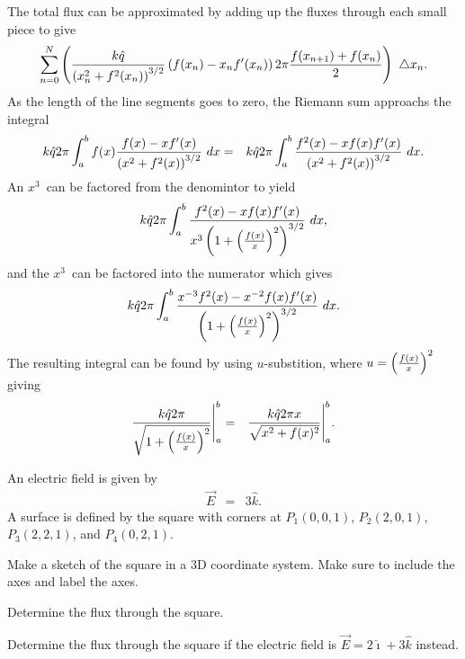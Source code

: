 The total flux can be approximated by adding up the fluxes through
each small piece to give
\begin{eqnarray*}
  \sum_{n=0}^N \left( \frac{k\hat{q}}{\left( x_n^2+f^2(x_n)\right)^{3/2} }
  \left( f(x_n) - x_n f'(x_n) \right) 2 \pi \frac{f(x_{n+1})+f(x_n)}{2} \right)
  ~ \triangle x_n.
\end{eqnarray*}
As the length of the line segments goes to zero, the Riemann sum
approachs the integral
\begin{eqnarray*}
  k\hat{q}2\pi \int^b_a f(x)\frac{f(x)-xf'(x)}{\left( x^2+f^2(x) \right)^{3/2}}
     ~ dx & = &
     k\hat{q}2\pi \int^b_a \frac{f^2(x)-xf(x)f'(x)}{\left( x^2+f^2(x)
       \right)^{3/2}} ~ dx.
\end{eqnarray*}
An $x^3$\ can be factored from the denomintor to yield
\begin{eqnarray*}
  k\hat{q}2\pi \int^b_a \frac{f^2(x)-xf(x)f'(x)}{x^3 \left(
    1+\left( \frac{f(x)}{x} \right)^2 \right)^{3/2}} ~ dx,
\end{eqnarray*}
and the $x^3$\ can be factored into the numerator which gives
\begin{eqnarray*}
  k\hat{q}2\pi \int^b_a \frac{x^{-3}f^2(x)-x^{-2}f(x)f'(x)}{\left(
    1+\left( \frac{f(x)}{x} \right)^2 \right)^{3/2}} ~ dx.
\end{eqnarray*}
The resulting integral can be found by using $u$-substition, where
$u=\left( \frac{f(x)}{x} \right)^2$ giving
\begin{eqnarray*}
    \frac{k\hat{q}2\pi}{\sqrt{1+\left( \frac{f(x)}{x} \right)^2 }}
     \Bigg|^b_a
     & = & \frac{k\hat{q}2\pi x}{\sqrt{x^2 + f(x)^2}}
     \Bigg|^b_a.
\end{eqnarray*}




\begin{problem}
\item An electric field is given by
\begin{eqnarray*}
  \vec{E} & = & 3 \hat{k}.
\end{eqnarray*}
A surface is defined by the square with corners at $P_1(0,0,1)$, $P_2(2,0,1)$, $P_3(2,2,1)$, and $P_4(0,2,1)$.
\begin{subproblem}
  \item Make a sketch of the square in a 3D coordinate system. Make sure to include the axes and label the axes.
    \vfill
  \item Determine the flux through the square.
    \vfill
  \item Determine the flux through the square if the electric field is $\vec{E} = 2\hat{\imath} + 3\hat{k}$ instead.
    \vfill
\end{subproblem}
\end{problem}


